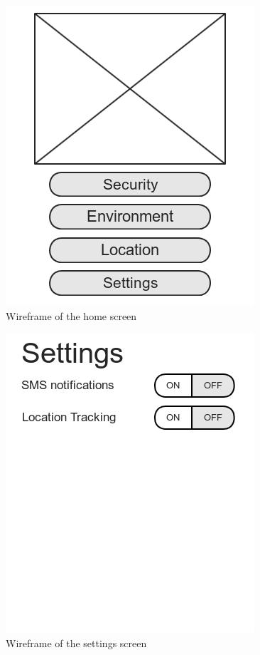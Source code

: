 \documentclass{report}
\begin{document}
\begin{figure}[H]
    \centering
    \includegraphics[scale=0.5]{mock_home}
    \caption[Wireframe of the home screen]
            {Wireframe of the home screen}
    \label{fig:wireframe-home}
\end{figure}

\begin{figure}[H]
    \centering
    \includegraphics[scale=0.5]{mock_settings}
    \caption[Wireframe of the settings screen]
            {Wireframe of the settings screen}
    \label{fig:wireframe-settings}
\end{figure}
\end{document}
